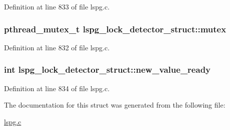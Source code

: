 Definition at line 833 of file lspg.\-c.

\hypertarget{structlspg__lock__detector__struct_ab5ab5534b376a8fbafdd0b54cec4483c}{
\subsubsection[{mutex}]{\setlength{\rightskip}{0pt plus 5cm}pthread\-\_\-mutex\-\_\-t lspg\-\_\-lock\-\_\-detector\-\_\-struct\-::mutex}}\label{structlspg__lock__detector__struct_ab5ab5534b376a8fbafdd0b54cec4483c}


Definition at line 832 of file lspg.\-c.

\hypertarget{structlspg__lock__detector__struct_a62373414b815fe178edd8522b3bd4d78}{
\subsubsection[{new\-\_\-value\-\_\-ready}]{\setlength{\rightskip}{0pt plus 5cm}int lspg\-\_\-lock\-\_\-detector\-\_\-struct\-::new\-\_\-value\-\_\-ready}}\label{structlspg__lock__detector__struct_a62373414b815fe178edd8522b3bd4d78}


Definition at line 834 of file lspg.\-c.



The documentation for this struct was generated from the following file\-:\begin{DoxyCompactItemize}
\item 
\hyperlink{lspg_8c}{lspg.\-c}\end{DoxyCompactItemize}
